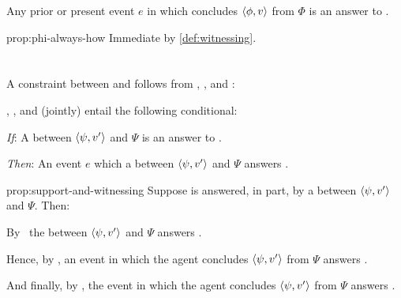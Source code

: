 \begin{note}
  \begin{proposition}%
    \label{prop:phi-always-how}%
    Any prior or present event \(e\) in which \vAgent{} concludes \(\langle \phi, v \rangle\) from \(\Phi\) is an answer to \qHowV{}.
  \end{proposition}

  \begin{argument}{prop:phi-always-how}
    Immediate by \autoref{def:witnessing}.
  \end{argument}
\end{note}

\section{\issueConstraint{}}
\label{cha:var:issue}

\begin{note}
  A constraint between \qWhyV{} and \qHowV{} follows from \linkW{}, \linkH{}, and \issueInclusion{}:

  \begin{proposition}[\qWhyV{}-\qWhy{}-\qHow{}-\qHowV{}]%
    \label{prop:support-and-witnessing}%
      \linkW{}, \linkH{}, and \issueInclusion{} (jointly) entail the following conditional:
      \begin{itenum}
      \item[\emph{If}:]
        A \ros{} between \(\langle \psi, v' \rangle\) and \(\Psi\) is an answer to \qWhyV{}.
      \item[\emph{Then}:]
        An event \(e\) which  a \ros{} between \(\langle \psi, v' \rangle\) and \(\Psi\) answers \qHowV{}.
      \end{itenum}
    \vspace{-\baselineskip}
  \end{proposition}

  \begin{argument}{prop:support-and-witnessing}
    Suppose \qWhyV{} is answered, in part, by a \ros{} between \(\langle \psi, v' \rangle\) and \(\Psi\).
    Then:

    By~\linkW{} the \ros{} between \(\langle \psi, v' \rangle\) and \(\Psi\) answers \qWhy{}.

    Hence, by \issueInclusion{}, an event in which the agent concludes \(\langle \psi, v' \rangle\) from \(\Psi\) answers \qHow{}.

    And finally, by \linkH{}, the event in which the agent concludes \(\langle \psi, v' \rangle\) from \(\Psi\) answers \qHowV{}.
  \end{argument}
\end{note}



